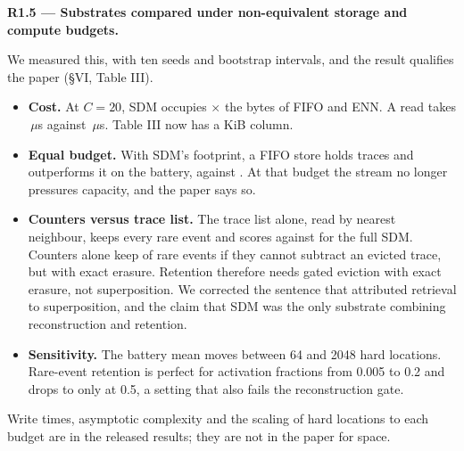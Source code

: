 \documentclass[11pt]{article}
\newcommand{\comment}[1]{\par\medskip\noindent\textbf{#1}\par}
\begin{document}
\comment{R1.5 --- Substrates compared under non-equivalent storage and compute budgets.}
We measured this, with ten seeds and bootstrap intervals, and the result
qualifies the paper (§VI, Table III).
\begin{itemize}
\item \textbf{Cost.} At $C=20$, SDM occupies
$\times$
the bytes of FIFO and ENN. A read takes
\,$\mu$s
against \,$\mu$s.
Table III now has a KiB column.
\item \textbf{Equal budget.} With SDM's footprint, a FIFO store holds
traces and outperforms it on the battery,
against
.
At that budget the stream no longer pressures capacity, and the paper says so.
\item \textbf{Counters versus trace list.} The trace list alone, read by
nearest neighbour, keeps every rare event and scores
against 
for the full SDM. Counters alone keep
of rare events if they cannot subtract an evicted trace, but
with exact erasure. Retention therefore needs gated eviction with exact
erasure, not superposition. We corrected the sentence that attributed
retrieval to superposition, and the claim that SDM was the only substrate
combining reconstruction and retention.
\item \textbf{Sensitivity.} The battery mean moves
between 64 and 2048 hard locations. Rare-event retention is perfect for
activation fractions from 0.005 to 0.2 and drops to
only at 0.5, a setting that also fails the reconstruction gate.
\end{itemize}
Write times, asymptotic complexity and the scaling of hard locations to each
budget are in the released results; they are not in the paper for space.
\end{document}
